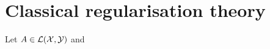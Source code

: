 \section{Classical regularisation theory}
\begin{definition}
    Let $A \in \mathcal L(\mathcal X, \mathcal Y)$ and 
\end{definition}